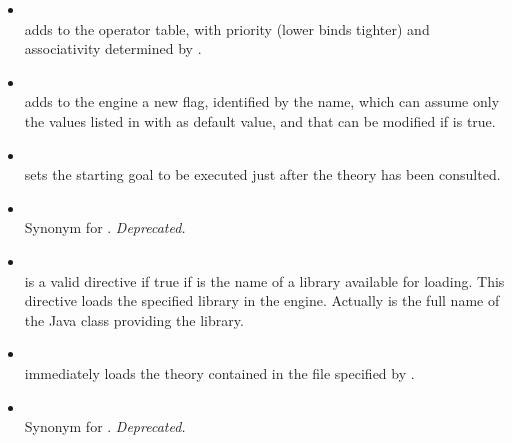 \begin{itemize}
 \item {}\\
 \noindent{} adds 
 to the operator table, with priority (lower binds tighter)
  and associativity determined by .\\
 \noindent{}
 \item {}\\
 \noindent{}
 adds to the engine a new flag, identified by the 
 name, which can assume only the values listed in
  with  as default value, and
 that can be modified if  is true.\\
 \noindent{}
 \item {}\\
 \noindent{} sets the starting goal to be executed just
 after the theory has been consulted.\\
 \noindent{}
 \item {}\\
 \noindent Synonym for . \emph{Deprecated.}\\
 \noindent{}
 \item {}\\
 \noindent{} is a valid directive if true if
  is the name of a \tuprolog{} library available
 for loading. This directive loads the specified library in the engine.
 Actually  is the full name of the Java class providing the library.\\
 \noindent{}
 \item {}\\
 \noindent{} immediately loads the theory
 contained in the file specified by .\\
 \noindent{}
 \item {}\\
 \noindent Synonym for . \emph{Deprecated.}\\
 \noindent{}
\end{itemize}
%
